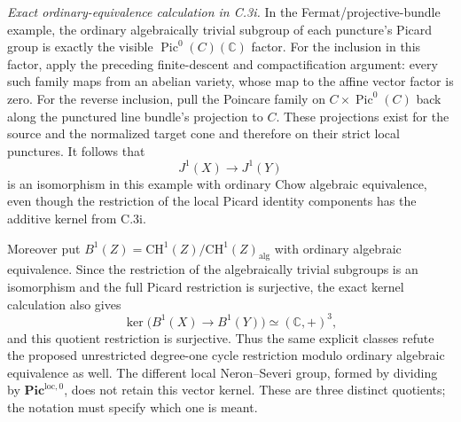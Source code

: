 \emph{Exact ordinary-equivalence calculation in C.3i.}
In the Fermat/projective-bundle example, the ordinary
algebraically trivial subgroup of each puncture's
Picard group is exactly the visible
$\operatorname{Pic}^0(C)(\mathbb C)$ factor. For the
inclusion in this factor, apply the preceding
finite-descent and compactification argument: every
such family maps from an abelian variety, whose
map to the affine vector factor is zero. For the
reverse inclusion, pull the Poincare family on
$C\times\operatorname{Pic}^0(C)$ back along the
punctured line bundle's projection to $C$.
These projections exist for the source and the
normalized target cone and therefore on their
strict local punctures. It follows that
\[
 J^1(X)\longrightarrow J^1(Y)
\]
is an isomorphism in this example with ordinary
Chow algebraic equivalence, even though the
restriction of the local Picard identity components
has the additive kernel from C.3i.

Moreover put
$B^1(Z)=\mathrm{CH}^1(Z)/\mathrm{CH}^1(Z)_{\mathrm{alg}}$
with ordinary algebraic equivalence. Since the
restriction of the algebraically trivial subgroups
is an isomorphism and the full Picard restriction
is surjective, the exact kernel calculation also
gives
\[
 \ker\bigl(B^1(X)\longrightarrow B^1(Y)\bigr)
                       \simeq(\mathbb C,+)^3,
\]
and this quotient restriction is surjective.
Thus the same explicit classes refute the proposed
unrestricted degree-one cycle restriction modulo
ordinary algebraic equivalence as well. The
different local Neron--Severi group, formed by
dividing by $\mathbf{Pic}^{\mathrm{loc},0}$,
does not retain this vector kernel. These are
three distinct quotients; the notation must specify
which one is meant.
